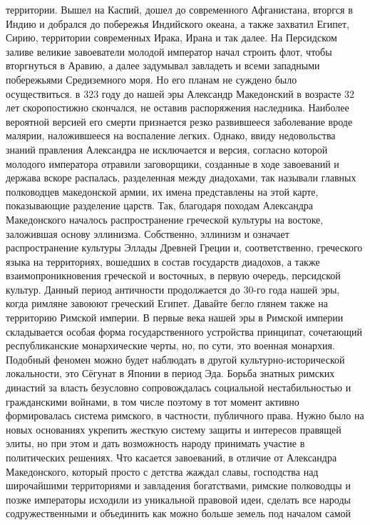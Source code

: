 территории. Вышел на Каспий, дошел до современного Афганистана, вторгся в Индию
и добрался до побережья Индийского океана, а также захватил Египет, Сирию,
территории современных Ирака, Ирана и так далее. На Персидском заливе великие
завоеватели молодой император начал строить флот, чтобы вторгнуться в Аравию, а
далее задумывал завладеть и всеми западными побережьями Средиземного моря. Но
его планам не суждено было осуществиться. в 323 году до нашей эры Александр
Македонский в возрасте 32 лет скоропостижно скончался, не оставив распоряжения
наследника. Наиболее вероятной версией его смерти признается резко развившееся
заболевание вроде малярии, наложившееся на воспаление легких. Однако, ввиду
недовольства знаний правления Александра не исключается и версия, согласно
которой молодого императора отравили заговорщики, созданные в ходе завоеваний и
держава вскоре распалась, разделенная между диадохами, так называли главных
полководцев македонской армии, их имена представлены на этой карте, показывающие
разделение царств. Так, благодаря походам Александра Македонского началось
распространение греческой культуры на востоке, заложившая основу эллинизма.
Собственно, эллинизм и означает распространение культуры Эллады Древней Греции
и, соответственно, греческого языка на территориях, вошедших в состав государств
диадохов, а также взаимопроникновения греческой и восточных, в первую очередь,
персидской культур. Данный период античности продолжается до 30-го года нашей
эры, когда римляне завоюют греческий Египет. Давайте бегло глянем также на
территорию Римской империи. В первые века нашей эры в Римской империи
складывается особая форма государственного устройства принципат, сочетающий
республиканские монархические черты, но, по сути, это военная монархия. Подобный
феномен можно будет наблюдать в другой культурно-исторической локальности, это
Сёгунат в Японии в период Эда. Борьба знатных римских династий за власть
безусловно сопровождалась социальной нестабильностью и гражданскими войнами, в
том числе поэтому в тот момент активно формировалась система римского, в
частности, публичного права. Нужно было на новых основаниях укрепить жесткую
систему защиты и интересов правящей элиты, но при этом и дать возможность народу
принимать участие в политических решениях. Что касается завоеваний, в отличие от
Александра Македонского, который просто с детства жаждал славы, господства над
широчайшими территориями и завладения богатствами, римские полководцы и позже
императоры исходили из уникальной правовой идеи, сделать все народы
содружественными и объединить как можно больше земель под началом самой
